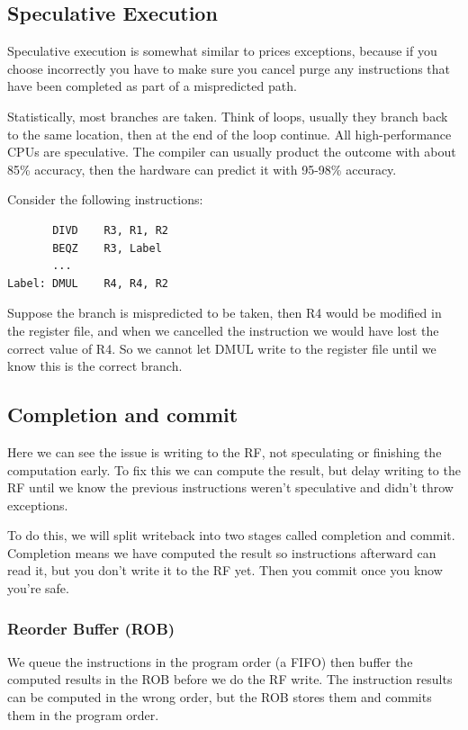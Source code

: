 \documentclass{article}
\begin{document}
\subsection{Speculative Execution}

Speculative execution is somewhat similar to prices exceptions, because if you choose incorrectly you have to make sure you cancel purge any instructions that have been completed as part of a mispredicted path. 

Statistically, most branches are taken. Think of loops, usually they branch back to the same location, then at the end of the loop continue. All high-performance CPUs are speculative. The compiler can usually product the outcome with about 85\% accuracy, then the hardware can predict it with 95-98\% accuracy. 

Consider the following instructions:

\begin{verbatim}
       DIVD    R3, R1, R2
       BEQZ    R3, Label
       ...
Label: DMUL    R4, R4, R2
\end{verbatim}

Suppose the branch is mispredicted to be taken, then R4 would be modified in the register file, and when we cancelled the instruction we would have lost the correct value of R4. So we cannot let DMUL write to the register file until we know this is the correct branch.

\subsection{Completion and commit}

Here we can see the issue is writing to the RF, not speculating or finishing the computation early. To fix this we can compute the result, but delay writing to the RF until we know the previous instructions weren't speculative and didn't throw exceptions.

To do this, we will split writeback into two stages called completion and commit. Completion means we have computed the result so instructions afterward can read it, but you don't write it to the RF yet. Then you commit once you know you're safe.

\subsubsection{Reorder Buffer (ROB)}

We queue the instructions in the program order (a FIFO) then buffer the computed results in the ROB before we do the RF write. The instruction results can be computed in the wrong order, but the ROB stores them and commits them in the program order.
\end{document}
